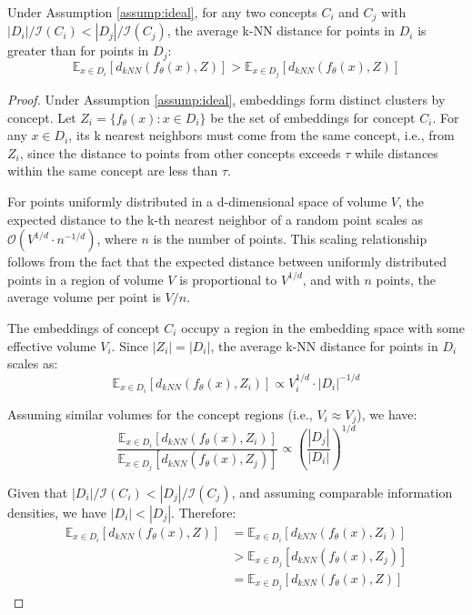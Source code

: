 \begin{theorem}
\label{thm:density}
Under Assumption \ref{assump:ideal}, for any two concepts $C_i$ and $C_j$ with $|D_i|/\mathcal{I}(C_i) < |D_j|/\mathcal{I}(C_j)$, the average k-NN distance for points in $D_i$ is greater than for points in $D_j$:
\begin{equation}
\mathbb{E}_{x \in D_i}[d_{kNN}(f_\theta(x), Z)] > \mathbb{E}_{x \in D_j}[d_{kNN}(f_\theta(x), Z)]
\end{equation}
\end{theorem}

\begin{proof}
Under Assumption \ref{assump:ideal}, embeddings form distinct clusters by concept. Let $Z_i = \{f_\theta(x) : x \in D_i\}$ be the set of embeddings for concept $C_i$. For any $x \in D_i$, its k nearest neighbors must come from the same concept, i.e., from $Z_i$, since the distance to points from other concepts exceeds $\tau$ while distances within the same concept are less than $\tau$.

\noindent
For points uniformly distributed in a d-dimensional space of volume $V$, the expected distance to the k-th nearest neighbor of a random point scales as $\mathcal{O}(V^{1/d} \cdot n^{-1/d})$, where $n$ is the number of points. This scaling relationship follows from the fact that the expected distance between uniformly distributed points in a region of volume $V$ is proportional to $V^{1/d}$, and with $n$ points, the average volume per point is $V/n$.

\noindent
The embeddings of concept $C_i$ occupy a region in the embedding space with some effective volume $V_i$. Since $|Z_i| = |D_i|$, the average k-NN distance for points in $D_i$ scales as:
\begin{equation}
\mathbb{E}_{x \in D_i}[d_{kNN}(f_\theta(x), Z_i)] \propto V_i^{1/d} \cdot |D_i|^{-1/d}
\end{equation}

\noindent
Assuming similar volumes for the concept regions (i.e., $V_i \approx V_j$), we have:
\begin{equation}
\frac{\mathbb{E}_{x \in D_i}[d_{kNN}(f_\theta(x), Z_i)]}{\mathbb{E}_{x \in D_j}[d_{kNN}(f_\theta(x), Z_j)]} \propto \left(\frac{|D_j|}{|D_i|}\right)^{1/d}
\end{equation}

\noindent
Given that $|D_i|/\mathcal{I}(C_i) < |D_j|/\mathcal{I}(C_j)$, and assuming comparable information densities, we have $|D_i| < |D_j|$. Therefore:
\begin{equation}
\begin{aligned}
\mathbb{E}_{x \in D_i}[d_{kNN}(f_\theta(x), Z)] &= \mathbb{E}_{x \in D_i}[d_{kNN}(f_\theta(x), Z_i)] \\
&> \mathbb{E}_{x \in D_j}[d_{kNN}(f_\theta(x), Z_j)] \\
&= \mathbb{E}_{x \in D_j}[d_{kNN}(f_\theta(x), Z)]
\end{aligned}
\end{equation}
\end{proof}

